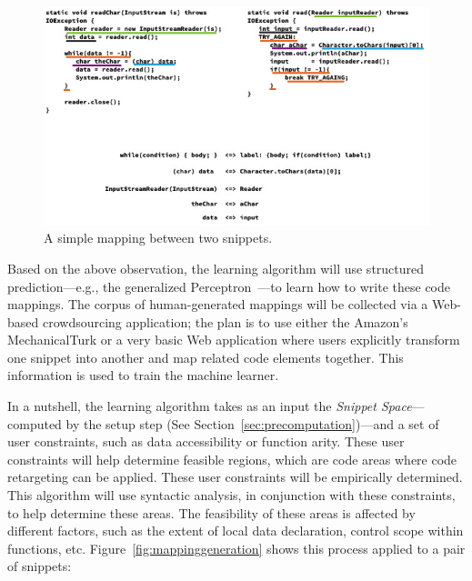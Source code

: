 \begin{figure}[!ht]
    \centering
    \includegraphics[width=\textwidth]{images/mappings}
    \caption{A simple mapping between two snippets.}
    \label{fig:mappings}
\end{figure}

Based on the above observation, the learning algorithm will use structured prediction---e.g., the generalized Perceptron~\cite{Collins:2002uo}---to learn how to write these code mappings. The corpus of human-generated mappings will be collected via a Web-based crowdsourcing application; the plan is to use either the Amazon's MechanicalTurk or a very basic Web application where users explicitly transform one snippet into another and map related code elements together. This information is used to train the machine learner.

In a nutshell, the learning algorithm takes as an input the \emph{Snippet Space}---computed by the setup step (See Section~\ref{sec:precomputation})---and a set of user constraints, such as data accessibility or function arity. These user constraints will help determine feasible regions, which are code areas where code retargeting can be applied. These user constraints will be empirically determined. This algorithm will use syntactic analysis, in conjunction with these constraints, to help determine these areas. The feasibility of these areas is affected by different factors, such as the extent of local data declaration, control scope within functions, etc. Figure~\ref{fig:mappinggeneration} shows this process applied to a pair of snippets:

